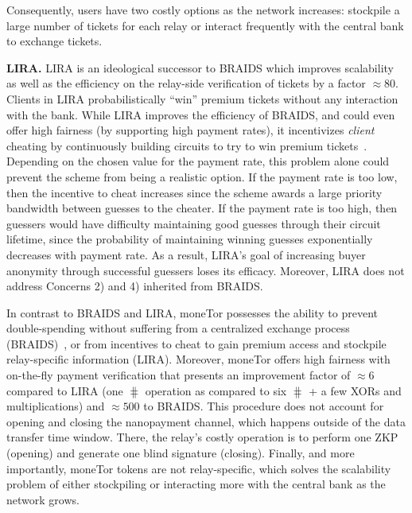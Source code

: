 Consequently, users have two costly options as the network increases: stockpile a large number of tickets for each relay or interact frequently with the central bank to exchange tickets.

\medskip\noindent\textbf{LIRA.}
LIRA is an ideological successor to BRAIDS which improves scalability as well as the efficiency on the relay-side verification of tickets by a factor $\approx 80$.
Clients in LIRA probabilistically ``win'' premium tickets without any interaction with the bank.
While LIRA improves the efficiency of BRAIDS, and could even offer high fairness (by supporting high payment rates), it incentivizes \textit{client} cheating by continuously building circuits to try to win premium tickets~\cite{jansen2013lira, jansenblogpost}.
Depending on the chosen value for the payment rate, this problem alone could prevent the scheme from being a realistic option.
If the payment rate is too low, then the incentive to cheat increases since the scheme awards a large priority bandwidth between guesses to the cheater.
If the payment rate is too high, then guessers would have difficulty maintaining good guesses through their circuit lifetime, since the probability of maintaining winning guesses exponentially decreases with payment rate.
As a result, LIRA's goal of increasing buyer anonymity through successful guessers loses its efficacy.
Moreover, LIRA does not address Concerns 2) and 4) inherited from BRAIDS.

In contrast to BRAIDS and LIRA, moneTor possesses the ability to prevent double-spending without suffering from a centralized exchange process (BRAIDS)~\cite{jansenblogpost}, or from incentives to cheat to gain premium access and stockpile relay-specific information (LIRA).
Moreover, moneTor offers high fairness with on-the-fly payment verification that presents an improvement factor of $\approx 6$ compared to LIRA (one $\hash$ operation as compared to six $\hash$ + a few XORs and multiplications) and $\approx 500$ to BRAIDS.
This procedure does not account for opening and closing the nanopayment channel, which happens outside of the data transfer time window.
There, the relay's costly operation is to perform one ZKP (opening) and generate one blind signature (closing).
Finally, and more importantly, moneTor tokens are not relay-specific, which solves the scalability problem of either stockpiling or interacting more with the central bank as the network grows.

